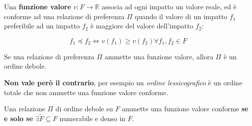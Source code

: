 \documentclass[\main/main.tex]{subfiles}
\begin{document}
\vspace{5mm}

Una \textbf{funzione valore} $v: F \rightarrow \mathbb{R}$ associa ad ogni impatto un valore reale, ed è conforme ad una relazione di preferenza $\Pi$ quando il valore di un impatto $f_1$ preferibile ad un impatto $f_2$ è maggiore del valore dell'impatto $f_2$:

\[
  f_1 \preceq f_2 \Leftrightarrow v(f_1) \geq v(f_2) \forall f_1, f_2 \in F
\]

Se una relazione di preferenza $\Pi$ ammette una funzione valore, allora $\Pi$ è un ordine debole.

\textbf{Non vale però il contrario}, per esempio un \textit{ordine lessicografico} è un ordine totale che non ammette una funzione valore conforme.

Una relazione $\Pi$ di ordine debole su $F$ ammette una funzione valore conforme \textbf{se e solo se} $\exists \tilde{F} \subseteq F$ numerabile e denso in $F$.
\end{document}
